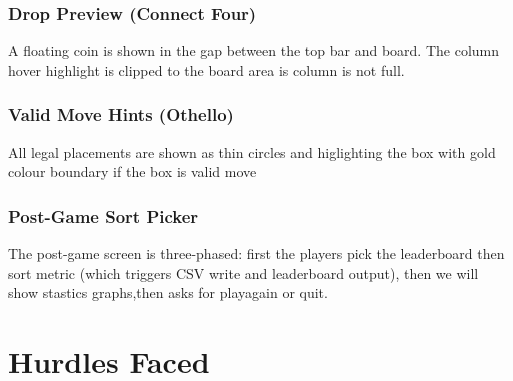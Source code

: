 \documentclass[12pt, letterpaper]{article}
\begin{document}
\subsubsection*{Drop Preview (Connect Four)}
A floating coin is shown in the gap between the top bar and board. The column hover highlight is clipped to the board
area is column is not full.

\subsubsection*{Valid Move Hints  (Othello)}
All legal placements are shown as thin circles and higlighting the box with gold
colour boundary if the box is valid move

\subsubsection*{Post-Game Sort Picker}
The post-game screen is three-phased: first the players pick the leaderboard then
sort metric (which triggers CSV write and leaderboard output), then we will show stastics graphs,then asks for playagain or quit.

\section{Hurdles Faced}
\end{document}
